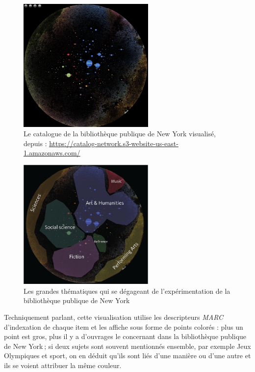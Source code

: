 \begin{figure}[h!]
	\centering
	\includegraphics[width=0.6\textwidth]{images/NYPLlab.png}
	\caption{Le catalogue de la bibliothèque publique de New York visualisé, depuis : \url{https://catalog-network.s3-website-us-east-1.amazonaws.com/}}
	\label{fig:image33}
\end{figure}



\begin{figure}[h!]
	\centering
	\includegraphics[width=0.6\textwidth]{images/image12.png}
	\caption{Les grandes thématiques qui se dégageant de l'expérimentation de la bibliothèque publique de New York}
	\label{fig:image12}
\end{figure}

Techniquement parlant, cette visualisation utilise les descripteurs \textit{MARC} d’indexation de chaque item et les affiche sous forme de points colorés : plus un point est gros, plus il y a d’ouvrages le concernant dans la bibliothèque publique de New York ; si deux sujets sont souvent mentionnés ensemble, par exemple Jeux Olympiques et sport, on en déduit qu’ils sont liés d’une manière ou d’une autre et ils se voient attribuer la même couleur.

